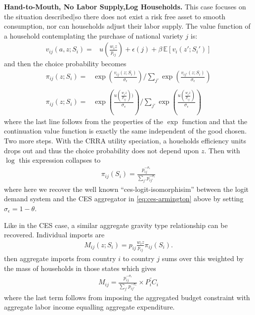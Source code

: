\documentclass[12pt,pdftex]{article}
\begin{document}
\begin{onehalfspacing}
\textbf{Hand-to-Mouth, No Labor Supply,Log Households.} This case focuses on the situation described|so there does not exist a risk free asset to smooth consumption, nor can households adjust their labor supply. The value function of a household contemplating the purchase of national variety $j$ is:
\begin{align}
v_{ij}(a, z;  S_i  ) = &   u\left( \frac{w_{i}z}{p_{ij}} \right) + \epsilon(j)  + \beta \, \mathbb{E} [v_{i}(z'; S_i' )]
\end{align}
and then the choice probability becomes
\begin{align}
\pi_{ij}(z; S_i) = & \exp \left( \frac{ v_{ij}(z;  S_i ) }{\sigma_{\epsilon}} \right) \Bigg / \sum_{j'} \exp \left( \frac{ v_{ij'}(z;  S_i ) }{\sigma_{\epsilon}} \right) \\
\nonumber\\
\pi_{ij}(z; S_i) = & \exp \left( \frac{ u\left( \frac{w_{i}z}{p_{ij}} \right) ) }{\sigma_{\epsilon}} \right) \Bigg / \sum_{j'} \exp \left( \frac{ u\left( \frac{w_{i}z}{p_{ij}} \right) }{\sigma_{\epsilon}} \right)
\end{align}
where the last line follows from the properties of the $\exp$ function and that the continuation value function is exactly the same independent of the good chosen. Two more steps. With the CRRA utility speciation, a houeholds efficiency units drops out and thus the choice probability does not depend upon $z$. Then with $\log$ this expression collapses to
\begin{align}
\pi_{ij}(S_i) = \frac{p_{ij}^{-\sigma_{\epsilon}}}{\sum_{j'} p_{ij'}^{-\sigma_{\epsilon}}}
\end{align}
where here we recover the well known ``ces-logit-isomorphisim'' between the logit demand system and the CES aggregator in \ref{eq:ces-armington} above by setting $\sigma_\epsilon = 1 - \theta$.

Like in the CES case, a similar aggregate gravity type relationship can be recovered. Individual imports are
\begin{align}
M_{ij}(z; S_i) = p_{ij} \frac{w_{i}z}{p_{ij}} \pi_{ij}(S_i).
\end{align}
then aggregate imports from country $i$ to country $j$ sums over this weighted by the mass of households in those states which gives
\begin{align}
M_{ij} =  \frac{p_{ij}^{-\sigma_{\epsilon}}}{\sum_{j'} p_{ij'}^{-\sigma_{\epsilon}}} \times \widetilde{P_{i} C_{i}}
\end{align}
where the last term follows from imposing the aggregated budget constraint with aggregate labor income equalling aggregate expenditure.


\end{onehalfspacing}
\end{document}
